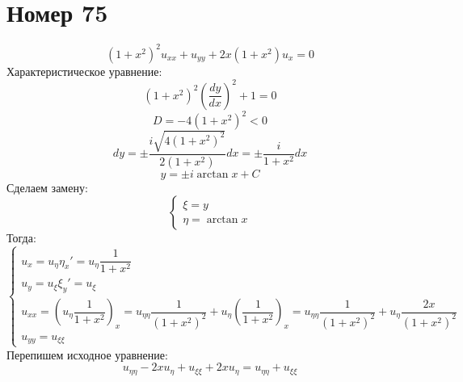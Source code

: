 










\section*{Номер 75}
$$ (1 + x^2)^2 u_{xx} + u_{yy} + 2x(1 + x^2)u_x = 0 $$
Характеристическое уравнение: $$ (1 + x^2)^2 \left(\dfrac{dy}{dx}\right)^2 + 1
    = 0 $$ $$ D = -4(1 + x^2)^2 < 0 $$ $$ dy = \pm \dfrac{i \sqrt{4(1 +
            x^2)^2}}{2(1 + x^2)}dx = \pm \dfrac{i}{1 + x^2}dx $$ $$ y = \pm i \arctan{x} +
    C $$ Сделаем замену: $$ \begin{cases}
        \xi = y \\
        \eta = \arctan{x}
    \end{cases} $$
Тогда:
$$ \begin{cases}
        u_{x} = u_\eta \eta_x' = u_\eta \dfrac{1}{1 + x^2}                                                                                                                                                          \\
        u_{y} = u_\xi \xi_y' = u_\xi                                                                                                                                                                                \\
        u_{xx} = \left(u_\eta \dfrac{1}{1 + x^2}\right)_x = u_{\eta \eta} \dfrac{1}{(1 + x^2)^2} + u_\eta \left(\dfrac{1}{1 + x^2}\right)_x = u_{\eta \eta} \dfrac{1}{(1 + x^2)^2} + u_\eta \dfrac{2x}{(1 + x^2)^2} \\
        u_{yy} = u_{\xi \xi}
    \end{cases} $$
Перепишем исходное уравнение:
$$ u_{\eta \eta} - 2x u_\eta + u_{\xi \xi} + 2x u_\eta = u_{\eta \eta} + u_{\xi \xi} $$

